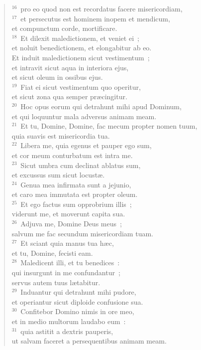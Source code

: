 \begin{flushleft}
\begin{verse}
${}^{16}$~pro eo quod non est recordatus facere misericordiam,\\
${}^{17}$~et persecutus est hominem inopem et mendicum,\\ et compunctum corde, mortificare.\\
${}^{18}$~Et dilexit maledictionem, et veniet ei~;\\ et noluit benedictionem, et elongabitur ab eo.\\ Et induit maledictionem sicut vestimentum~;\\ et intravit sicut aqua in interiora ejus,\\ et sicut oleum in ossibus ejus.\\
${}^{19}$~Fiat ei sicut vestimentum quo operitur,\\ et sicut zona qua semper pr\ae cingitur.\\
${}^{20}$~Hoc opus eorum qui detrahunt mihi apud Dominum,\\ et qui loquuntur mala adversus animam meam.\\
${}^{21}$~Et tu, Domine, Domine, fac mecum propter nomen tuum,\\ quia suavis est misericordia tua.\\
${}^{22}$~Libera me, quia egenus et pauper ego sum,\\ et cor meum conturbatum est intra me.\\
${}^{23}$~Sicut umbra cum declinat ablatus sum,\\ et excussus sum sicut locust\ae .\\
${}^{24}$~Genua mea infirmata sunt a jejunio,\\ et caro mea immutata est propter oleum.\\
${}^{25}$~Et ego factus sum opprobrium illis~;\\ viderunt me, et moverunt capita sua.\\
${}^{26}$~Adjuva me, Domine Deus meus~;\\ salvum me fac secundum misericordiam tuam.\\
${}^{27}$~Et sciant quia manus tua h\ae c,\\ et tu, Domine, fecisti eam.\\
${}^{28}$~Maledicent illi, et tu benedices~:\\ qui insurgunt in me confundantur~;\\ servus autem tuus l\ae tabitur.\\
${}^{29}$~Induantur qui detrahunt mihi pudore,\\ et operiantur sicut diploide confusione sua.\\
${}^{30}$~Confitebor Domino nimis in ore meo,\\ et in medio multorum laudabo eum~:\\
${}^{31}$~quia astitit a dextris pauperis,\\ ut salvam faceret a persequentibus animam meam.\end{verse}\end{flushleft}




